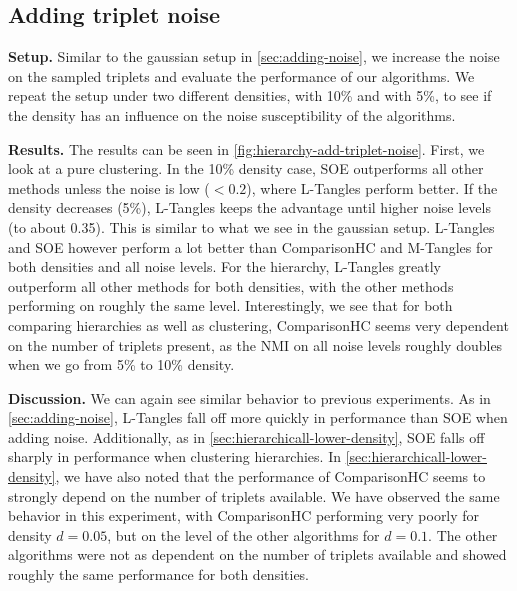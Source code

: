 \subsection{Adding triplet noise}\label{sec:h-triplet-noise}
\textbf{Setup.}
Similar to the gaussian setup in \autoref{sec:adding-noise}, we increase the noise on the sampled triplets and evaluate the performance of our algorithms. 
We repeat the setup under two different densities, with 10\% and with 5\%, to see if the density has an influence
on the noise susceptibility of the algorithms.

\noindent
\textbf{Results.}
The results can be seen in \autoref{fig:hierarchy-add-triplet-noise}. 
First, we look at a pure clustering. In the 10\% density case, SOE outperforms all other methods unless the noise is
low ($<0.2$), where L-Tangles perform better. If the density decreases (5\%), L-Tangles keeps the 
advantage until higher noise levels (to about 0.35). 
This is similar to what we see in the gaussian setup.
L-Tangles and SOE however perform a lot better than ComparisonHC and M-Tangles for both densities and all noise levels.  For the hierarchy, L-Tangles greatly outperform all other methods for both densities,
with the other methods performing on roughly the same level. Interestingly, 
we see that for both comparing hierarchies as well as clustering, 
ComparisonHC seems very dependent on the number of triplets present, as the NMI on all noise levels
roughly doubles when we go from 5\% to 10\% density.

\textbf{Discussion.}
We can again see similar behavior to previous experiments. As in \autoref{sec:adding-noise}, L-Tangles fall off more quickly in performance than SOE when adding noise. 
Additionally, as in \autoref{sec:hierarchicall-lower-density}, SOE falls off sharply in performance when clustering hierarchies. In \autoref{sec:hierarchicall-lower-density}, 
we have also noted that the performance of ComparisonHC seems to strongly depend on the number of triplets available. We have observed the same behavior in this experiment,
with ComparisonHC performing very poorly for density $d=0.05$, but on the level of the other algorithms for $d=0.1$. The other algorithms were not as dependent on the number of 
triplets available and showed roughly the same performance for both densities.

